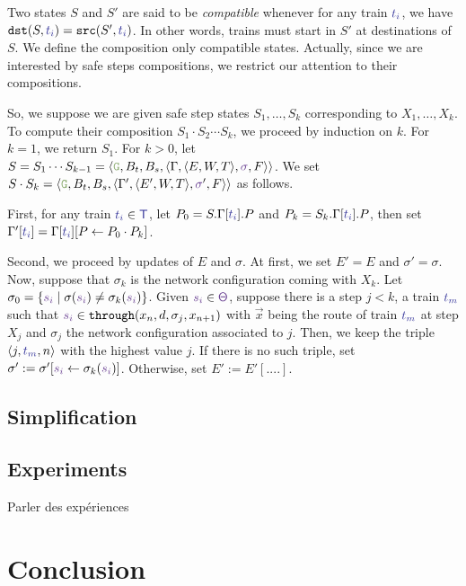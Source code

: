 \documentclass[runningheads]{llncs}
\newcommand{\throughS}{{\mathtt{through}}}
\newcommand{\swFmt}[1]{{\color{swcolor}{#1}}}
\newcommand{\sid}[1]{\ensuremath{\swFmt{s_{#1}}}}
\newcommand{\turnouts}{\swFmt{\mathsf{\Theta}}}
\newcommand{\switches}{\ensuremath{\swFmt{\sigma}}}
\newcommand{\trainFmt}[1]{{\color{traincolor} #1}}
\newcommand{\trains}{{\trainFmt{\mathsf{T}}}}
\newcommand{\tid}[1]{\ensuremath{\trainFmt{t_{#1}}}}
\newcommand{\signals}{\ensuremath{F}}
\newcommand{\guardFmt}[1]{{\color{guardcolor} \ensuremath{\mathtt{#1}}}}
\newcommand{\guardG}{\guardFmt{G}}
\newcommand{\bufferFmt}[1]{#1}
\newcommand{\bufTrain}{\ensuremath{\bufferFmt{B_t}}\xspace}
\newcommand{\bufSig}{\ensuremath{\bufferFmt{B_s}}\xspace}
\begin{document}
Two states $S$ and $S'$ are said to be \emph{compatible} whenever  for any train $\tid{i}$, we have $\mathtt{dst}(S, \tid{i})  =  \mathtt{src}(S', \tid{i})$. In other words, trains must start in $S'$ at destinations of $S$. We define the composition only compatible states. Actually, since we are interested by safe steps compositions, we restrict our attention to their compositions.
  
So, we suppose we are given safe step states $S_1, \ldots, S_k$ corresponding to $X_1, \ldots, X_k$. To compute their composition $S_1 \cdot S_2 \cdots S_k$, we proceed by induction on $k$. For $k = 1$, we return $S_1$. For $k>0$, let $S = S_1 \cdots S_{k-1}  = \langle \guardG, \bufTrain, \bufSig, \langle \Gamma, \langle E, W, T\rangle, \switches, \signals\rangle \rangle$. We set $S \cdot S_k = \langle \guardG, \bufTrain, \bufSig, \langle \Gamma', \langle E', W, T\rangle, \switches', \signals\rangle \rangle$ as follows. 

First,  for any train $\tid{i} \in \trains$, let $P_0 = S.\Gamma[\tid{i}].P$ and $P_k = S_k.\Gamma[\tid{i}].P$, then set $\Gamma'[\tid{i}] = \Gamma[\tid{i}][ P \leftarrow P_0 \cdot P_k]$. 

Second, we proceed by updates of $E$ and $\sigma$. At first, we set $E' = E$ and $\sigma' = \sigma$. Now, suppose that $\sigma_k$ is the network configuration coming with $X_k$. Let $\sigma_0 = \{ \sid{i} \mid \sigma(\sid{i}) \neq  \sigma_k(\sid{i})\}$. Given  $\sid{i} \in \turnouts$, suppose there is a step $j < k$, a train $\tid{m}$ such that $\sid{i} \in \throughS(x_n, d, \sigma_j, x_{n+1})$ with $\vec{x}$ being the route of train $\tid{m}$ at step $X_j$ and $\sigma_j$ the network configuration associated to $j$. Then, we keep the triple  $\langle j, \tid{m}, n\rangle$ with the highest value $j$. If there is no such triple, set $\sigma' := \sigma'[ \sid{i} \leftarrow \sigma_k(\sid{i})]$.  Otherwise, set $E' := E'[ ....]$.   

\subsection{Simplification}

\subsection{Experiments} 
Parler des expériences

\section{Conclusion}
\label{sec:conclusion}
\end{document}
